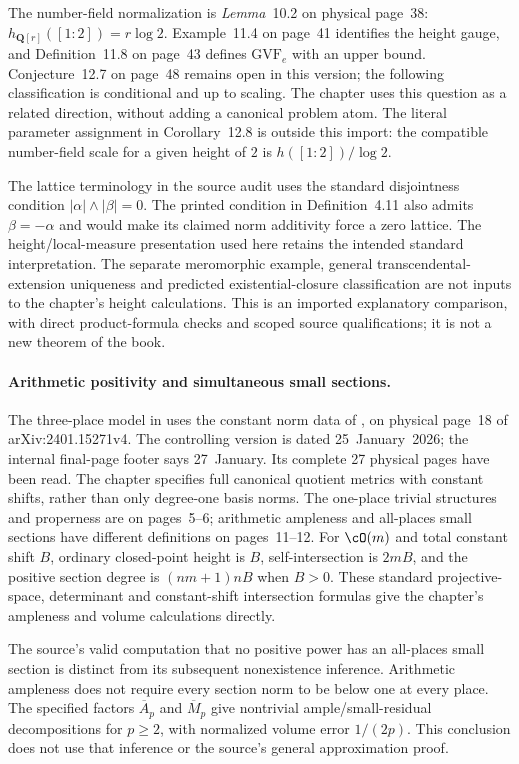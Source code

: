 The number-field normalization is \emph{Lemma}~10.2 on physical page~38:
$h_{\mathbf Q[r]}([1:2])=r\log2$.  Example~11.4 on page~41 identifies the
height gauge, and Definition~11.8 on page~43 defines $\mathrm{GVF}_e$
with an upper bound.  Conjecture~12.7 on page~48 remains open in this
version; the following classification is conditional and up to scaling.
The chapter uses this question as a related direction, without adding
a canonical problem atom.  The literal parameter assignment in
Corollary~12.8 is outside this import: the compatible number-field scale
for a given height of $2$ is $h([1:2])/\log2$.

The lattice terminology in the source audit uses the standard disjointness
condition $|\alpha|\wedge|\beta|=0$.  The printed condition in
Definition~4.11 also admits $\beta=-\alpha$ and would make its claimed norm
additivity force a zero lattice.  The height/local-measure presentation
used here retains the intended standard interpretation.  The separate
meromorphic example, general transcendental-extension uniqueness and
predicted existential-closure classification are not inputs to the
chapter's height calculations.  This is an imported explanatory
comparison, with direct product-formula checks and scoped source
qualifications; it is not a new theorem of the book.

\paragraph{Arithmetic positivity and simultaneous small sections.}

The three-place model in  uses the constant
norm data of \cite[Example~4.4]{Liu26AdelicFujitaV4}, on physical page~18
of arXiv:2401.15271v4.  The controlling version is dated 25~January~2026;
the internal final-page footer says 27~January.  Its complete 27 physical
pages have been read.  The chapter specifies full canonical quotient
metrics with constant shifts, rather than only degree-one basis norms.
The one-place trivial structures and properness are on pages~5--6;
arithmetic ampleness and all-places small sections have different
definitions on pages~11--12.  For $\cO(m)$ and total constant shift $B$,
ordinary closed-point height is $B$, self-intersection is $2mB$, and the
positive section degree is $(nm+1)nB$ when $B>0$.  These standard
projective-space, determinant and constant-shift intersection formulas
give the chapter's ampleness and volume calculations directly.

The source's valid computation that no positive power has an all-places
small section is distinct from its subsequent nonexistence inference.
Arithmetic ampleness does not require every section norm to be below one
at every place.  The specified factors $\overline A_p$ and
$\overline M_p$ give nontrivial ample/small-residual decompositions for
$p\geq2$, with normalized volume error $1/(2p)$.  This conclusion does
not use that inference or the source's general approximation proof.

